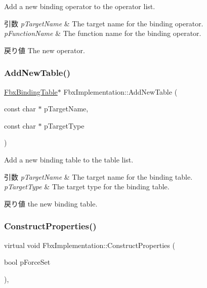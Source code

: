 Add a new binding operator to the operator list. 
\begin{DoxyParams}{引数}
{\em p\+Target\+Name} & The target name for the binding operator. \\
\hline
{\em p\+Function\+Name} & The function name for the binding operator. \\
\hline
\end{DoxyParams}
\begin{DoxyReturn}{戻り値}
The new operator. 
\end{DoxyReturn}
\mbox{\label{class_fbx_implementation_af84aa8a3ee2de64fb485fec5079495c1}} 
\subsubsection{\texorpdfstring{Add\+New\+Table()}{AddNewTable()}}
{\footnotesize\ttfamily \hyperlink{class_fbx_binding_table}{Fbx\+Binding\+Table}$\ast$ Fbx\+Implementation\+::\+Add\+New\+Table (\begin{DoxyParamCaption}\item[{const char $\ast$}]{p\+Target\+Name,  }\item[{const char $\ast$}]{p\+Target\+Type }\end{DoxyParamCaption})}

Add a new binding table to the table list. 
\begin{DoxyParams}{引数}
{\em p\+Target\+Name} & The target name for the binding table. \\
\hline
{\em p\+Target\+Type} & The target type for the binding table. \\
\hline
\end{DoxyParams}
\begin{DoxyReturn}{戻り値}
the new binding table. 
\end{DoxyReturn}
\mbox{\label{class_fbx_implementation_aba2d4d41452596b51bbb74efb21e863c}} 
\subsubsection{\texorpdfstring{Construct\+Properties()}{ConstructProperties()}}
{\footnotesize\ttfamily virtual void Fbx\+Implementation\+::\+Construct\+Properties (\begin{DoxyParamCaption}\item[{bool}]{p\+Force\+Set }\end{DoxyParamCaption})\hspace{0.3cm}{\ttfamily [protected]}, {\ttfamily [virtual]}}

